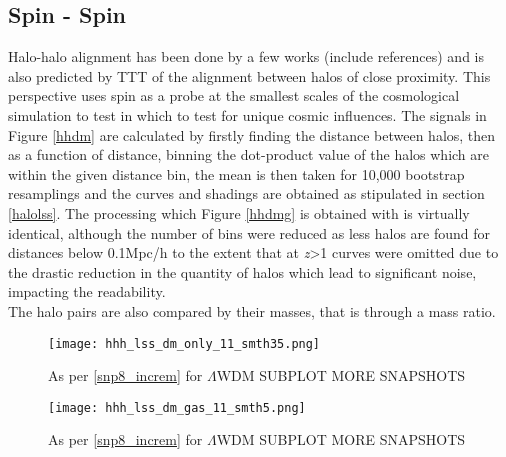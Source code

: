\documentclass[a4paper,fleqn,usenatbib]{mnras}
\def \lwdm{$\Lambda$WDM }
\begin{document}
\subsection{Spin - Spin}\label{ss}
Halo-halo alignment has been done by a few works (include references) and is also predicted by TTT of the alignment between halos of close proximity. This perspective uses spin as a probe at the smallest scales of the cosmological simulation to test in which to test for unique cosmic influences. The signals in Figure \ref{hhdm} are calculated by firstly finding the distance between halos, then as a function of distance, binning the dot-product value of the halos which are within the given distance bin, the mean is then taken for 10,000 bootstrap resamplings and the curves and shadings are obtained as stipulated in section \ref{halolss}.
The processing which Figure \ref{hhdmg} is obtained with is virtually identical, although the number of bins were reduced as less halos are found for distances below 0.1Mpc/h to the extent that at \textit{z}>1 curves were omitted due to the drastic reduction in the quantity of halos which lead to significant noise, impacting the readability. 
\\
The halo pairs are also compared by their masses, that is through a mass ratio. 


\begin{figure}
\centering
\texttt{[image: hhh\_lss\_dm\_only\_11\_smth35.png]} 
\caption{As per \ref{snp8_increm} for \lwdm{} SUBPLOT MORE SNAPSHOTS }\label{hhhdm}
\end{figure}
\begin{figure}
\centering
\texttt{[image: hhh\_lss\_dm\_gas\_11\_smth5.png]} 
\caption{As per \ref{snp8_increm} for \lwdm{} SUBPLOT MORE SNAPSHOTS }\label{hhhdmg}
\end{figure}
\end{document}
